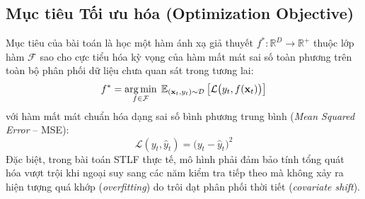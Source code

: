 \subsection{Mục tiêu Tối ưu hóa (Optimization Objective)}
Mục tiêu của bài toán là học một hàm ánh xạ giả thuyết $f^*: \mathbb{R}^D \to \mathbb{R}^+$ thuộc lớp hàm $\mathcal{F}$ sao cho cực tiểu hóa kỳ vọng của hàm mất mát sai số toàn phương trên toàn bộ phân phối dữ liệu chưa quan sát trong tương lai:
\begin{equation}
    f^* = \operatorname*{arg\,min}_{f \in \mathcal{F}} \; \mathbb{E}_{(\mathbf{x}_t, y_t) \sim \mathcal{D}} \left[ \mathcal{L}\big(y_t, f(\mathbf{x}_t)\big) \right]
\end{equation}
với hàm mất mát chuẩn hóa dạng sai số bình phương trung bình (\textit{Mean Squared Error} -- MSE):
\begin{equation}
    \mathcal{L}(y_t, \hat{y}_t) = \big(y_t - \hat{y}_t\big)^2
\end{equation}
Đặc biệt, trong bài toán STLF thực tế, mô hình phải đảm bảo tính tổng quát hóa vượt trội khi ngoại suy sang các năm kiểm tra tiếp theo mà không xảy ra hiện tượng quá khớp (\textit{overfitting}) do trôi dạt phân phối thời tiết (\textit{covariate shift}).

